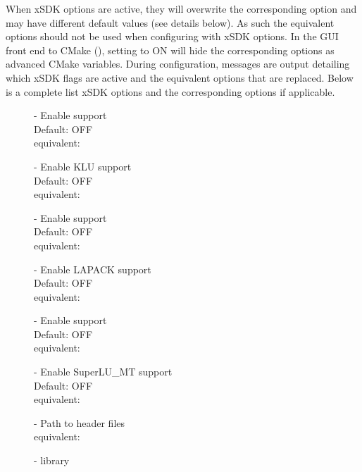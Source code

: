 {\warn} When xSDK options are active, they will overwrite the
corresponding {\sundials} option and may have different default values
(see details below). As such the equivalent {\sundials} options should
not be used when configuring with xSDK options. In the GUI front end
to CMake (), setting  to ON will
hide the corresponding {\sundials} options as advanced CMake variables.
During configuration, messages are output detailing
which xSDK flags are active and the equivalent {\sundials} options
that are replaced. Below is a complete list xSDK options and the
corresponding {\sundials} options if applicable.

\begin{description}
\item[] -
  Enable {\hypre} support
  \\
  Default: OFF
  \\
  {\sundials} equivalent: 
\item[] -
  Enable KLU support
  \\
  Default: OFF
  \\
  {\sundials} equivalent: 
\item[] -
  Enable {\petsc} support
  \\
  Default: OFF
  \\
  {\sundials} equivalent: 
\item[] -
  Enable LAPACK support
  \\
  Default: OFF
  \\
  {\sundials} equivalent: 
\item[] -
  Enable {\superludist} support
  \\
  Default: OFF
  \\
  {\sundials} equivalent: 
\item[] -
  Enable SuperLU\_MT support
  \\
  Default: OFF
  \\
  {\sundials} equivalent: 
\item[] -
  Path to {\hypre} header files
  \\
  {\sundials} equivalent: 
\item[] -
  {\hypre} library
  \\

\end{description}
